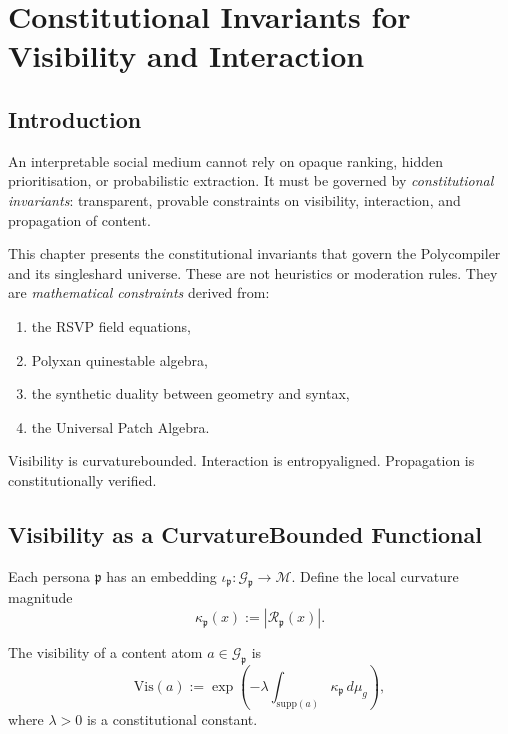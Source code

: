 \chapter{Constitutional Invariants for Visibility and Interaction}
\label{ch:constitutional-invariants}

\section{Introduction}

An interpretable social medium cannot rely on opaque ranking,
hidden prioritisation, or probabilistic extraction.
It must be governed by \emph{constitutional invariants}:
transparent, provable constraints on visibility, interaction, 
and propagation of content.

This chapter presents the constitutional invariants that govern
the Polycompiler and its single\textendash shard universe.
These are not heuristics or moderation rules.
They are \emph{mathematical constraints} derived from:

\begin{enumerate}
    \item the RSVP field equations,
    \item Polyxan quine\textendash stable algebra,
    \item the synthetic duality between geometry and syntax,
    \item the Universal Patch Algebra.
\end{enumerate}

Visibility is curvature\textendash bounded.
Interaction is entropy\textendash aligned.
Propagation is constitutionally verified.

\section{Visibility as a Curvature\textendash Bounded Functional}

Each persona $\mathfrak{p}$ has an embedding
$\iota_{\mathfrak{p}} : \mathcal{G}_{\mathfrak{p}} \to \mathcal{M}$.
Define the local curvature magnitude
\[
\kappa_{\mathfrak{p}}(x) := |\mathcal{R}_{\mathfrak{p}}(x)|.
\]

\begin{definition}
The visibility of a content atom $a \in \mathcal{G}_{\mathfrak{p}}$ is
\[
\mathrm{Vis}(a)
  := \exp\!\left( - \lambda \int_{\mathrm{supp}(a)}
                   \kappa_{\mathfrak{p}} \, d\mu_g \right),
\]
where $\lambda>0$ is a constitutional constant.
\end{definition}

